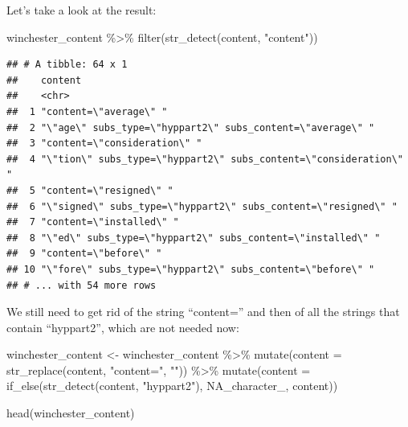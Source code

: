 \documentclass[
]{article}
\newenvironment{Shaded}{\begin{snugshade}}{\end{snugshade}}
\newcommand{\AttributeTok}[1]{\textcolor[rgb]{0.77,0.63,0.00}{#1}}
\newcommand{\ConstantTok}[1]{\textcolor[rgb]{0.00,0.00,0.00}{#1}}
\newcommand{\FunctionTok}[1]{\textcolor[rgb]{0.00,0.00,0.00}{#1}}
\newcommand{\NormalTok}[1]{#1}
\newcommand{\OtherTok}[1]{\textcolor[rgb]{0.56,0.35,0.01}{#1}}
\newcommand{\SpecialCharTok}[1]{\textcolor[rgb]{0.00,0.00,0.00}{#1}}
\newcommand{\StringTok}[1]{\textcolor[rgb]{0.31,0.60,0.02}{#1}}
\begin{document}
Let's take a look at the result:

\begin{Shaded}
\begin{Highlighting}[]
\NormalTok{winchester\_content }\SpecialCharTok{\%\textgreater{}\%} 
  \FunctionTok{filter}\NormalTok{(}\FunctionTok{str\_detect}\NormalTok{(content, }\StringTok{"content"}\NormalTok{))}
\end{Highlighting}
\end{Shaded}

\begin{verbatim}
## # A tibble: 64 x 1
##    content                                                          
##    <chr>                                                            
##  1 "content=\"average\" "                                           
##  2 "\"age\" subs_type=\"hyppart2\" subs_content=\"average\" "       
##  3 "content=\"consideration\" "                                     
##  4 "\"tion\" subs_type=\"hyppart2\" subs_content=\"consideration\" "
##  5 "content=\"resigned\" "                                          
##  6 "\"signed\" subs_type=\"hyppart2\" subs_content=\"resigned\" "   
##  7 "content=\"installed\" "                                         
##  8 "\"ed\" subs_type=\"hyppart2\" subs_content=\"installed\" "      
##  9 "content=\"before\" "                                            
## 10 "\"fore\" subs_type=\"hyppart2\" subs_content=\"before\" "       
## # ... with 54 more rows
\end{verbatim}

We still need to get rid of the string ``content='' and then of all the strings that contain ``hyppart2'',
which are not needed now:

\begin{Shaded}
\begin{Highlighting}[]
\NormalTok{winchester\_content }\OtherTok{\textless{}{-}}\NormalTok{ winchester\_content }\SpecialCharTok{\%\textgreater{}\%} 
  \FunctionTok{mutate}\NormalTok{(}\AttributeTok{content =} \FunctionTok{str\_replace}\NormalTok{(content, }\StringTok{"content="}\NormalTok{, }\StringTok{""}\NormalTok{)) }\SpecialCharTok{\%\textgreater{}\%} 
  \FunctionTok{mutate}\NormalTok{(}\AttributeTok{content =} \FunctionTok{if\_else}\NormalTok{(}\FunctionTok{str\_detect}\NormalTok{(content, }\StringTok{"hyppart2"}\NormalTok{), }\ConstantTok{NA\_character\_}\NormalTok{, content))}

\FunctionTok{head}\NormalTok{(winchester\_content)}
\end{Highlighting}
\end{Shaded}
\end{document}
